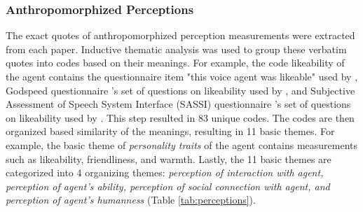 \documentclass[sigconf,screen,review, anonymous]{acmart}
\newcommand{\cmt}[1]{}%
\begin{document}
\subsubsection*{Anthropomorphized Perceptions}
The exact quotes of anthropomorphized perception measurements were extracted from each paper. Inductive thematic analysis was used to group these verbatim quotes into codes based on their meanings. For example, the code likeability of the agent contains the questionnaire item "this voice agent was likeable" used by \cite{cuadra2021my}\cmt{[67]}, Godspeed questionnaire \cite{bartneck2009measurement}\cmt{godspeed}'s set of questions on likeability used by \cite{linnemann2018can}\cmt{[15]}, and Subjective Assessment of Speech System Interface (SASSI) questionnaire \cite{hone2000towards}\cmt{sassi}'s set of questions on likeability used by  \cite{chan2021kinvoices}\cmt{[74]}\cite{choi2020nobody}\cmt{[54]}. This step resulted in 83 unique codes. The codes are then organized based similarity of the meanings, resulting in 11 basic themes. For example, the basic theme of \textit{personality traits} of the agent contains measurements such as likeability, friendliness, and warmth. Lastly, the 11 basic themes are categorized into 4 organizing themes: \textit{perception of interaction with agent, perception of agent's ability, perception of social connection with agent, and perception of agent's humanness} (Table \ref{tab:perceptions}).
\end{document}

